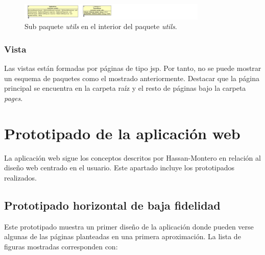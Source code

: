 \begin{figure}[!htbp]
  \centering
    \includegraphics[width=0.8\textwidth]{../img/diagramas/controller/servlet/tres.jpg}
  \caption{Sub paquete \textit{utils} en el interior del paquete \textit{utils}.}
  \label{util}
\end{figure}



\subsubsection{Vista}
Las vistas están formadas por páginas de tipo jsp. Por tanto, no se puede mostrar un esquema de paquetes como el mostrado anteriormente. Destacar que la página principal se encuentra en la carpeta raíz y el resto de páginas bajo la carpeta \textit{pages}.


\section{Prototipado de la aplicación web}

La aplicación web sigue los conceptos descritos por Hassan-Montero en relación al diseño web centrado en el usuario. Este apartado incluye los prototipados realizados.

\subsection{Prototipado horizontal de baja fidelidad}
Este prototipado muestra un primer diseño de la aplicación donde pueden verse algunas de las páginas planteadas en una primera aproximación. La lista de figuras mostradas corresponden con:

